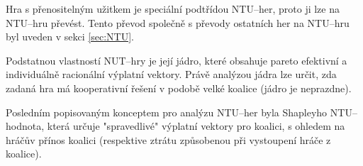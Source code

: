     Hra s přenositelným užitkem je speciální podtřídou NTU--her, proto ji lze na NTU--hru převést. Tento převod společně s převody ostatních her na NTU--hru byl uveden v sekci \ref{sec:NTU}.

    Podstatnou vlastností NUT--hry je její jádro, které obsahuje pareto efektivní a individuálně racionální výplatní vektory. Právě analýzou jádra lze určit, zda zadaná hra má kooperativní řešení v podobě velké koalice (jádro je neprazdne).

    Posledním popisovaným konceptem pro analýzu NTU--her byla Shapleyho NTU--hodnota, která určuje "spravedlivé" výplatní vektory pro koalici, s ohledem na hráčův přínos koalici (respektive ztrátu způsobenou při vystoupení hráče z koalice).

